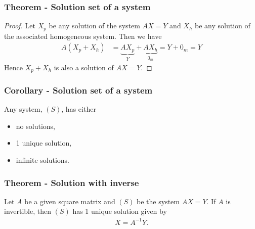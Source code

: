 \documentclass[usenames,dvipsnames,aspectratio=169,10pt]{beamer}
\numberwithin{equation}{section}
\begin{document}
\begin{frame}
\frametitle{Theorem - Solution set of a system}

\begin{proof} 
Let $X_p$ be any solution of the system $AX=Y$ and $X_h$ be any solution of the associated homogeneous system. Then we have
\begin{align*}
A(X_p + X_h) &= \underbrace{AX_p}_Y + \underbrace{AX_h}_{0_m} = Y + 0_m = Y
\end{align*}
Hence $X_p + X_h$ is also a solution of $AX=Y$.
\end{proof}
\end{frame}




\begin{frame}
\frametitle{Corollary - Solution set of a system}

Any system, $(S)$, has either
\begin{itemize}
\item no solutions,
\item 1 unique solution,
\item infinite solutions.
\end{itemize}

\end{frame}




\begin{frame}
\frametitle{Theorem - Solution with inverse}

Let $A$ be a given square matrix and $(S)$ be the system $AX=Y$. If $A$ is invertible, then $(S)$ has 1 unique solution given by
\begin{align*}
X = A^{-1} Y.
\end{align*}
\end{frame}
\end{document}
